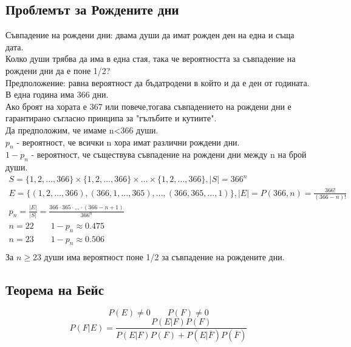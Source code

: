 \documentclass[fleqn, 12pt]{article}
\theoremstyle{definition}
\begin{document}
\subsection{Проблемът за Рождените дни}
Съвпадение на рождени дни: двама души да имат рожден ден на една и съща дата. \\
Колко души трябва да има в една стая, така че вероятността за съвпадение на рождени дни да е поне 1/2?\\
Предположение: равна вероятност да бъдатродени в който и да е ден от годината.\\
В една година има 366 дни.\\
Ако броят на хората е 367 или повече,тогава съвпадението на рождени дни е гарантирано съгласно принципа за "гълъбите и кутиите".\\
Да предположим, че имаме n<366 души.\\
$p_n$ - вероятност, че всички n хора имат различни рождени дни. \\
$1 - p_n$ - вероятност, че съществува съвпадение на рождени дни между n на брой души.
\begin{gather*}
S = \{1,2,...,366 \} \times \{1,2,...,366 \} \times ... \times \{1,2,...,366 \}, |S| = 366^n\\
E = \{(1,2,...,366), (366,1,...,365), ..., (366,365,...,1)\}, |E| = P(366,n) = \frac{366!}{(366-n)!}\\
p_n = \frac{|E|}{|S|} = \frac{366 \cdot 365 \cdot ... \cdot (366 - n + 1)}{366^n}\\
n = 22 \qquad 1 - p_n \approx 0.475\\
n = 23 \qquad 1- p_n \approx 0.506\\
\end{gather*}
За $n \geq 23$ души има вероятност поне 1/2 за съвпадение на рождените дни.

\subsection{Теорема на Бейс}
$$P(E) \neq 0 \qquad P(F) \neq 0$$
$$P(F|E) = \frac{P(E|F)P(F)}{P(E|F)P(F) + P(E|\overline{F})P(\overline{F})}$$
\end{document}

